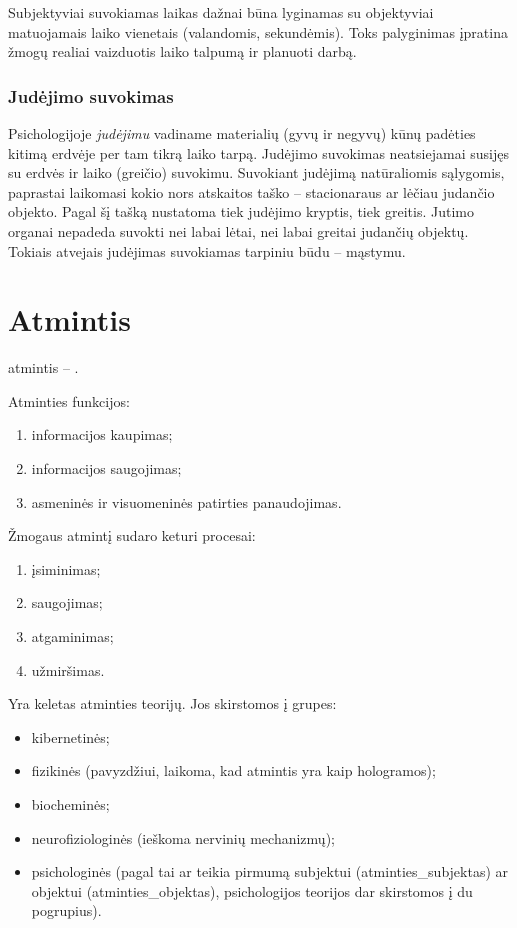 Subjektyviai suvokiamas laikas dažnai
būna lyginamas su objektyviai matuojamais laiko vienetais (valandomis, 
sekundėmis). Toks palyginimas įpratina žmogų realiai vaizduotis laiko 
talpumą ir planuoti darbą.

\subsubsection{Judėjimo suvokimas}

Psichologijoje \emph{judėjimu} vadiname materialių (gyvų ir negyvų) kūnų
padėties kitimą erdvėje per tam tikrą laiko tarpą. Judėjimo suvokimas 
neatsiejamai susijęs su erdvės ir laiko (greičio) suvokimu. Suvokiant 
judėjimą natūraliomis sąlygomis, paprastai laikomasi kokio nors atskaitos
taško – stacionaraus ar lėčiau judančio objekto. Pagal šį tašką nustatoma
tiek judėjimo kryptis, tiek greitis. Jutimo organai nepadeda suvokti nei 
labai lėtai, nei labai greitai judančių objektų. Tokiais atvejais judėjimas
suvokiamas tarpiniu būdu – mąstymu.

\section{Atmintis}

\label{tema:atmintis}

\Gls{atmintis} – .

Atminties funkcijos:

\begin{enumerate}
  \item informacijos kaupimas;
  \item informacijos saugojimas;
  \item asmeninės ir visuomeninės patirties panaudojimas.
\end{enumerate}

Žmogaus atmintį sudaro keturi procesai:

\begin{enumerate}
  \item įsiminimas;
  \item saugojimas;
  \item atgaminimas;
  \item užmiršimas.
\end{enumerate}

Yra keletas atminties teorijų. Jos skirstomos į grupes:

\begin{itemize}
  \item kibernetinės;
  \item fizikinės (pavyzdžiui, laikoma, kad atmintis yra kaip hologramos);
  \item biocheminės;
  \item neurofiziologinės (ieškoma nervinių mechanizmų);
  \item psichologinės (pagal tai ar teikia pirmumą subjektui 
    (\gls{atminties_subjektas}) ar objektui (\gls{atminties_objektas}),
    psichologijos teorijos dar skirstomos į du pogrupius).
\end{itemize}

